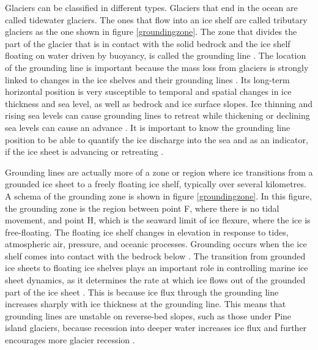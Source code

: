 \documentclass{article}
\begin{document}
Glaciers can be classified in different types. Glaciers that end in the ocean are called tidewater glaciers. The ones that flow into an ice shelf are called tributary glaciers as the one shown in figure \ref{groundingzone}. The zone that divides the part of the glacier that is in contact with the solid bedrock and the ice shelf floating on water driven by buoyancy, is called the grounding line \cite[]{cheng2019full}. The location of the grounding line is important because the mass loss from glaciers is strongly linked to changes in the ice shelves and their grounding lines \cite[]{brunt2010mapping,pritchard2012antarctic}. Its long-term horizontal position is very susceptible to temporal and spatial changes in ice thickness and sea level, as well as bedrock and ice surface slopes. Ice thinning and rising sea levels can cause grounding lines to retreat while thickening or declining sea levels can cause an advance \cite[]{friedl2020remote}. It is important to know the grounding line position to be able to quantify the ice discharge into the sea and as an indicator, if the ice sheet is advancing or retreating \cite[]{konrad2018net}.

Grounding lines are actually more of a zone or region where ice transitions from a grounded ice sheet to a freely floating ice shelf, typically over several kilometres. A schema of the grounding zone is shown in figure \ref{groundingzone}. In this figure, the grounding zone is the region between point F, where there is no tidal movement, and point H, which is the seaward limit of ice flexure, where the ice is free-floating. The floating ice shelf changes in elevation in response to tides, atmospheric air, pressure, and oceanic processes. Grounding occurs when the ice shelf comes into contact with the bedrock below \cite[]{fricker2009mapping}. The transition from grounded ice sheets to floating ice shelves plays an important role in controlling marine ice sheet dynamics, as it determines the rate at which ice flows out of the grounded part of the ice sheet \cite[]{schoof2007ice}. This is because ice flux through the grounding line increases sharply with ice thickness at the grounding line. This means that grounding lines are unstable on reverse-bed slopes, such as those under Pine island glaciers, because recession into deeper water increases ice flux and further encourages more glacier recession \cite[]{schoof2007marine}.
\end{document}
